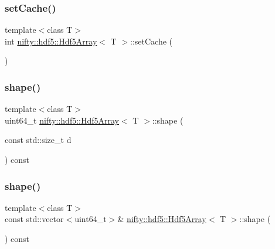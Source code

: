 \mbox{\label{classnifty_1_1hdf5_1_1Hdf5Array_a59e94ddc29dd4ba7e85a11c68960ea77}} 
\subsubsection{\texorpdfstring{set\+Cache()}{setCache()}}
{\footnotesize\ttfamily template$<$class T$>$ \\
int \hyperlink{classnifty_1_1hdf5_1_1Hdf5Array}{nifty\+::hdf5\+::\+Hdf5\+Array}$<$ T $>$\+::set\+Cache (\begin{DoxyParamCaption}{ }\end{DoxyParamCaption})\hspace{0.3cm}{\ttfamily [inline]}}

\mbox{\label{classnifty_1_1hdf5_1_1Hdf5Array_abdd78be3ed04346a5bffab6f86cadfc5}} 
\subsubsection{\texorpdfstring{shape()}{shape()}\hspace{0.1cm}{\footnotesize\ttfamily [1/2]}}
{\footnotesize\ttfamily template$<$class T$>$ \\
uint64\+\_\+t \hyperlink{classnifty_1_1hdf5_1_1Hdf5Array}{nifty\+::hdf5\+::\+Hdf5\+Array}$<$ T $>$\+::shape (\begin{DoxyParamCaption}\item[{const std\+::size\+\_\+t}]{d }\end{DoxyParamCaption}) const\hspace{0.3cm}{\ttfamily [inline]}}

\mbox{\label{classnifty_1_1hdf5_1_1Hdf5Array_a960760163a8422c8138410c7513ef5cb}} 
\subsubsection{\texorpdfstring{shape()}{shape()}\hspace{0.1cm}{\footnotesize\ttfamily [2/2]}}
{\footnotesize\ttfamily template$<$class T$>$ \\
const std\+::vector$<$uint64\+\_\+t$>$\& \hyperlink{classnifty_1_1hdf5_1_1Hdf5Array}{nifty\+::hdf5\+::\+Hdf5\+Array}$<$ T $>$\+::shape (\begin{DoxyParamCaption}{ }\end{DoxyParamCaption}) const\hspace{0.3cm}{\ttfamily [inline]}}

